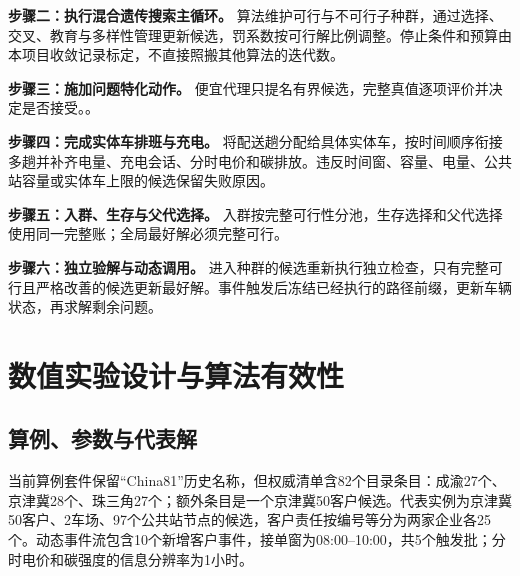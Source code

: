 \textbf{步骤二：执行混合遗传搜索主循环。} 算法维护可行与不可行子种群，通过选择、交叉、教育与多样性管理更新候选，罚系数按可行解比例调整。停止条件和预算由本项目收敛记录标定，不直接照搬其他算法的迭代数。

\textbf{步骤三：施加问题特化动作。} 便宜代理只提名有界候选，完整真值逐项评价并决定是否接受。。

\textbf{步骤四：完成实体车排班与充电。} 将配送趟分配给具体实体车，按时间顺序衔接多趟并补齐电量、充电会话、分时电价和碳排放。违反时间窗、容量、电量、公共站容量或实体车上限的候选保留失败原因。

\textbf{步骤五：入群、生存与父代选择。} 入群按完整可行性分池，生存选择和父代选择使用同一完整账；全局最好解必须完整可行。

\textbf{步骤六：独立验解与动态调用。} 进入种群的候选重新执行独立检查，只有完整可行且严格改善的候选更新最好解。事件触发后冻结已经执行的路径前缀，更新车辆状态，再求解剩余问题。

\section{数值实验设计与算法有效性}

\subsection{算例、参数与代表解}

当前算例套件保留“China81”历史名称，但权威清单含82个目录条目：成渝27个、京津冀28个、珠三角27个；额外条目是一个京津冀50客户候选。代表实例为京津冀50客户、2车场、97个公共站节点的候选，客户责任按编号等分为两家企业各25个。动态事件流包含10个新增客户事件，接单窗为08:00--10:00，共5个触发批；分时电价和碳强度的信息分辨率为1小时。

